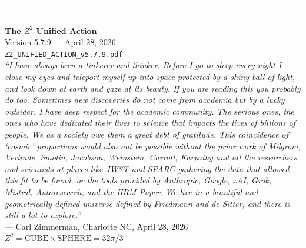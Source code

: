 \documentclass[11pt,a4paper]{article}
\theoremstyle{plain}
\theoremstyle{definition}
\theoremstyle{remark}
\begin{document}
\vspace{2cm}
\begin{center}
\rule{0.8\textwidth}{0.5pt}\\[0.5cm]
\textbf{The $Z^2$ Unified Action}\\[0.3cm]
Version 5.7.9 --- April 28, 2026\\[0.3cm]
\texttt{Z2\_UNIFIED\_ACTION\_v5.7.9.pdf}\\[0.5cm]

\emph{``I have always been a tinkerer and thinker. Before I go to sleep every night I close my eyes and teleport myself up into space protected by a shiny ball of light, and look down at earth and gaze at its beauty. If you are reading this you probably do too. Sometimes new discoveries do not come from academia but by a lucky outsider. I have deep respect for the academic community. The serious ones, the ones who have dedicated their lives to science that impacts the lives of billions of people. We as a society owe them a great debt of gratitude. This coincidence of `cosmic' proportions would also not be possible without the prior work of Milgrom, Verlinde, Smolin, Jacobson, Weinstein, Carroll, Karpathy and all the researchers and scientists at places like JWST and SPARC gathering the data that allowed this fit to be found, or the tools provided by Anthropic, Google, xAI, Grok, Mistral, Autoresearch, and the HRM Paper. We live in a beautiful and geometrically defined universe defined by Friedmann and de Sitter, and there is still a lot to explore.''}\\[0.3cm]
--- Carl Zimmerman, Charlotte NC, April 28, 2026\\[0.5cm]

\textbf{$Z^2 = \text{CUBE} \times \text{SPHERE} = 32\pi/3$}
\end{center}
\end{document}
